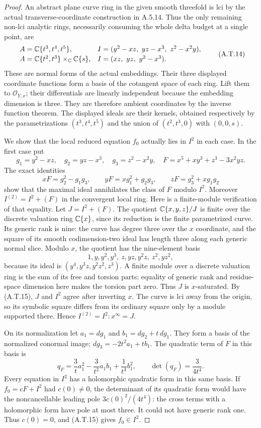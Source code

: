 \begin{proof}
An abstract plane curve ring in the given smooth
threefold is lci by the actual transverse-coordinate
construction in A.5.14. Thus the only remaining
non-lci analytic rings, necessarily consuming the
whole delta budget at a single point, are
\[
\begin{array}{ll}
 A=\mathbb C\{t^3,t^4,t^5\},
 &I=(y^2-xz,\ yz-x^3,\ z^2-x^2y),\\[2pt]
 A=\mathbb C\{t^2,t^3\}\times_{\mathbb C}\mathbb C\{s\},
 &I=(xz,\ yz,\ y^2-x^3).
\end{array}                                             \tag{A.T.14}
\]
These are normal forms of the actual embeddings.
Their three displayed coordinate functions form a
basis of the cotangent space of each ring. Lift them
to $\mathcal O_{Y,x}$; their differentials are linearly
independent because the embedding dimension is three.
They are therefore ambient coordinates by the inverse
function theorem. The displayed ideals are their
kernels, obtained respectively by the parametrizations
$(t^3,t^4,t^5)$ and the union of $(t^2,t^3,0)$ with
$(0,0,s)$.

We show that the local reduced equation $f_0$ actually
lies in $I^2$ in each case. In the first case put
\[
 g_1=y^2-xz,\quad g_2=yz-x^3,\quad
 g_3=z^2-x^2y,\quad
 F=x^5+xy^3+z^3-3x^2yz.
\]
The exact identities
\[
 xF=g_2^2-g_1g_3,\qquad
 yF=xg_1^2+g_2g_3,\qquad
 zF=g_3^2+xg_1g_2                              \tag{A.T.15}
\]
show that the maximal ideal annihilates the class of
$F$ modulo $I^2$. Moreover
$I^{(2)}=I^2+(F)$ in the convergent local ring.
Here is a finite-module verification of that equality.
Let $J=I^2+(F)$. The quotient $\mathbb C\{x,y,z\}/J$ is
finite over the discrete valuation ring $\mathbb C\{x\}$,
since its reduction is the finite parametrized curve.
Its generic rank is nine: the curve has degree three
over the $x$ coordinate, and the square of its smooth
codimension-two ideal has length three along each
generic normal slice. Modulo $x$, the quotient has
the nine-element basis
\[
 1,y,y^2,y^3,\ z,yz,y^2z,\ z^2,yz^2,
\]
because its ideal is $(y^4,y^3z,y^2z^2,z^3)$.
A finite module over a discrete valuation ring is
the sum of its free and torsion parts; equality of
generic rank and residue-space dimension here makes
the torsion part zero. Thus $J$ is $x$-saturated.
By (A.T.15), $J$ and $I^2$ agree after inverting $x$.
The curve is lci away from the origin, so its symbolic
square differs from its ordinary square only by a
module supported there. Hence
$I^{(2)}=I^2:x^\infty=J$.

On its normalization let
$a_1=dg_1$ and $b_1=dg_2+t\,dg_1$.
They form a basis of the normalized conormal image;
$dg_3=-2t^2a_1+t b_1$.
The quadratic term of $F$ in this basis is
\[
 q_F=\frac3t a_1^2-\frac3{t^2}a_1b_1
                           +\frac1{t^3}b_1^2,
 \qquad \det(q_F)=\frac3{4t^4}.                  \tag{A.T.16}
\]
Every equation in $I^2$ has a holomorphic quadratic
form in this same basis. If $f_0=cF+I^2$ had
$c(0)\ne0$, the determinant of its quadratic form
would have the noncancellable leading pole
$3c(0)^2/(4t^4)$: the cross terms with a holomorphic
form have pole at most three. It could not have
generic rank one. Thus $c(0)=0$, and (A.T.15) gives
$f_0\in I^2$.


\end{proof}
